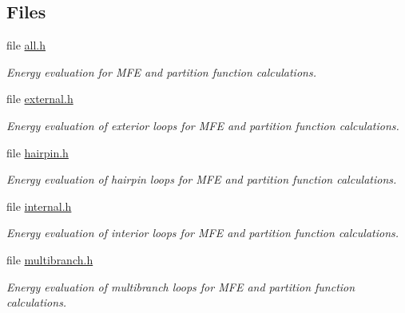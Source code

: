 \subsection*{Files}
\begin{DoxyCompactItemize}
\item 
file \mbox{\hyperlink{all_8h}{all.\+h}}
\begin{DoxyCompactList}\small\item\em Energy evaluation for M\+FE and partition function calculations. \end{DoxyCompactList}\item 
file \mbox{\hyperlink{external_8h}{external.\+h}}
\begin{DoxyCompactList}\small\item\em Energy evaluation of exterior loops for M\+FE and partition function calculations. \end{DoxyCompactList}\item 
file \mbox{\hyperlink{hairpin_8h}{hairpin.\+h}}
\begin{DoxyCompactList}\small\item\em Energy evaluation of hairpin loops for M\+FE and partition function calculations. \end{DoxyCompactList}\item 
file \mbox{\hyperlink{internal_8h}{internal.\+h}}
\begin{DoxyCompactList}\small\item\em Energy evaluation of interior loops for M\+FE and partition function calculations. \end{DoxyCompactList}\item 
file \mbox{\hyperlink{multibranch_8h}{multibranch.\+h}}
\begin{DoxyCompactList}\small\item\em Energy evaluation of multibranch loops for M\+FE and partition function calculations. \end{DoxyCompactList}\end{DoxyCompactItemize}
